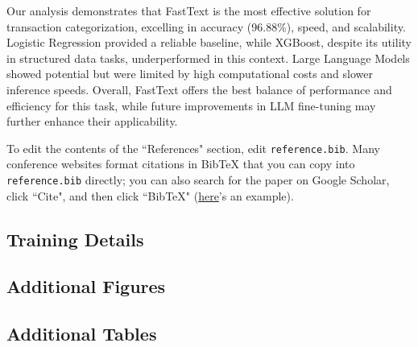 \documentclass[12pt,letterpaper]{article}
\begin{document}
Our analysis demonstrates that FastText is the most effective solution for transaction categorization, excelling in accuracy (96.88\%), speed, and scalability. Logistic Regression provided a reliable baseline, while XGBoost, despite its utility in structured data tasks, underperformed in this context. Large Language Models showed potential but were limited by high computational costs and slower inference speeds. Overall, FastText offers the best balance of performance and efficiency for this task, while future improvements in LLM fine-tuning may further enhance their applicability.



\makereference

{\color{blue} To edit the contents of the ``References" section, edit \texttt{reference.bib}. Many conference websites format citations in BibTeX that you can copy into \texttt{reference.bib} directly; you can also search for the paper on Google Scholar, click ``Cite", and then click ``BibTeX" (\href{https://scholar.google.com/scholar?hl=en&as_sdt=0%2C23&q=attention+is+all+you+need&btnG=#d=gs_cit&t=1700436667623&u=%2Fscholar%3Fq%3Dinfo%3A5Gohgn6QFikJ%3Ascholar.google.com%2F%26output%3Dcite%26scirp%3D0%26hl%3Den}{here}'s an example).}





\clearpage
\makeappendix

\subsection{Training Details}

\subsection{Additional Figures}

\subsection{Additional Tables}
\end{document}
